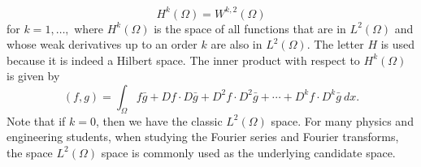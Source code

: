 \documentclass[10pt]{article}
\begin{document}
\begin{equation*}
	\displaystyle H^k(\Omega) = W^{k,2}(\Omega)
\end{equation*}
for $k = 1, \dots,$ where $H^k(\Omega)$ is the space of all functions that are in $L^2(\Omega)$ and whose weak derivatives up to an order $k$ are also in $L^2(\Omega)$. The letter $H$ is used because it is indeed a Hilbert space. The inner product with respect to $H^k(\Omega)$ is given by 
\begin{equation*}
	\displaystyle (f,g) = \int_{\Omega}{f\bar{g} + Df \cdot D\bar{g} + D^2f \cdot D^2\bar{g} + \cdots + D^k f  \cdot D^k \bar{g} \: dx}.
\end{equation*}
Note that if $k = 0$, then we have the classic $L^2(\Omega)$ space. For many physics and engineering students, when studying the Fourier series and Fourier transforms, the space $L^2(\Omega)$ space is commonly used as the underlying candidate space. 
\end{document}
